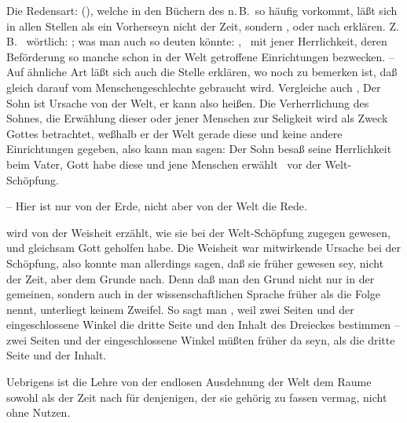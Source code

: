 \begin{aufza}
\begin{aufzb}
\item Die Redensart:  (), welche in den Büchern des n.\,B.\ so häufig vorkommt, läßt sich in allen Stellen als ein Vorherseyn nicht der Zeit, sondern , oder  nach erklären. Z.\,B.\  wörtlich: ; was man auch so deuten könnte: , \dh\ mit jener Herrlichkeit, deren Beförderung so manche schon in der Welt getroffene Einrichtungen bezwecken. -- Auf ähnliche Art läßt sich auch die Stelle  erklären, wo noch zu bemerken ist, daß gleich darauf  vom Menschengeschlechte gebraucht wird. Vergleiche auch ,  Der Sohn ist Ursache von der Welt, er kann also  heißen. Die Verherrlichung des Sohnes, die Erwählung dieser oder jener Menschen zur Seligkeit wird als Zweck Gottes betrachtet, weßhalb er der Welt gerade diese und keine andere Einrichtungen gegeben, also kann man sagen: Der Sohn besaß seine Herrlichkeit beim Vater, Gott habe diese und jene Menschen erwählt \usw\ vor der Welt-Schöpfung.
\item {}  -- Hier ist nur von der Erde, nicht aber von der Welt die Rede.
\item {} wird von der Weisheit erzählt, wie sie bei der Welt-Schöpfung zugegen gewesen, und gleichsam Gott geholfen habe. Die Weisheit war mitwirkende Ursache bei der Schöpfung, also konnte man allerdings sagen, daß sie früher gewesen sey, nicht der Zeit, aber dem Grunde nach. Denn daß man den Grund nicht nur in der gemeinen, sondern auch in der wissenschaftlichen Sprache früher als die Folge nennt, unterliegt keinem Zweifel. So sagt man \zB , weil zwei Seiten und der eingeschlossene Winkel die dritte Seite und den Inhalt des Dreieckes bestimmen -- zwei Seiten und der eingeschlossene Winkel müßten früher da seyn, als die dritte Seite und der Inhalt.
\end{aufzb}
\item Uebrigens ist die Lehre von der endlosen Ausdehnung der Welt dem Raume sowohl als der Zeit nach für denjenigen, der sie gehörig zu fassen vermag, nicht ohne Nutzen.

\end{aufza}
